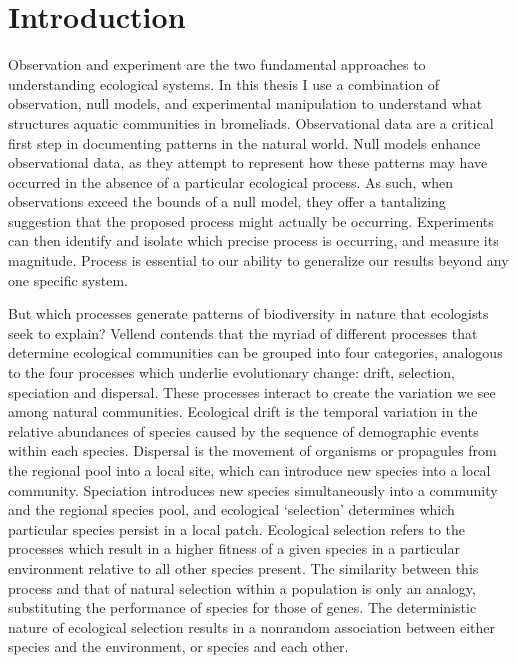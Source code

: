 \chapter{Introduction}
\label{chap:introduction}


\noindent

Observation and experiment are the two fundamental approaches to
understanding ecological systems. In this thesis I use a combination of
observation, null models, and experimental manipulation to understand
what structures aquatic communities in bromeliads. Observational data
are a critical first step in documenting patterns in the natural world.
Null models enhance observational data, as they attempt to represent how
these patterns may have occurred in the absence of a particular
ecological process. As such, when observations exceed the bounds of a
null model, they offer a tantalizing suggestion that the proposed
process might actually be occurring. Experiments can then identify and
isolate which precise process is occurring, and measure its magnitude.
Process is essential to our ability to generalize our results beyond any
one specific system.

But which processes generate patterns of biodiversity in nature that
ecologists seek to explain? Vellend \citep{Vellend2010b} contends that
the myriad of different processes that determine ecological communities
can be grouped into four categories, analogous to the four processes
which underlie evolutionary change: drift, selection, speciation and
dispersal. These processes interact to create the variation we
see among natural communities. Ecological drift is the temporal
variation in the relative abundances of species caused by the sequence
of demographic events within each species. Dispersal is the movement of
organisms or propagules from the regional pool into a local site, which
can introduce new species into a local community. Speciation introduces
new species simultaneously into a community and the regional species
pool, and ecological `selection' determines which particular species
persist in a local patch. Ecological selection refers to the processes
which result in a higher fitness of a given species in a particular
environment relative to all other species present. The similarity
between this process and that of natural selection within a population
is only an analogy, substituting the performance of species for those of
genes. The deterministic nature of ecological selection results in a
nonrandom association between either species and the environment, or
species and each other.


